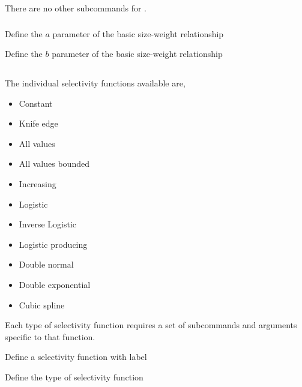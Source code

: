 There are no other subcommands for .

\subsubsection[Basic]{}

 {Define the $a$ parameter of the basic size-weight relationship}

 {Define the $b$ parameter of the basic size-weight relationship}

\subsection{}

The individual selectivity functions available are,

\begin{itemize}
	\item Constant
	\item Knife edge
	\item All values
	\item All values bounded
	\item Increasing
	\item Logistic
	\item Inverse Logistic
	\item Logistic producing
	\item Double normal
	\item Double exponential
	\item Cubic spline
\end{itemize}

Each type of selectivity function requires a set of subcommands and arguments specific to that function.

 {Define a selectivity function with label}

 {Define the type of selectivity function}

\subsubsection[Constant]{}

